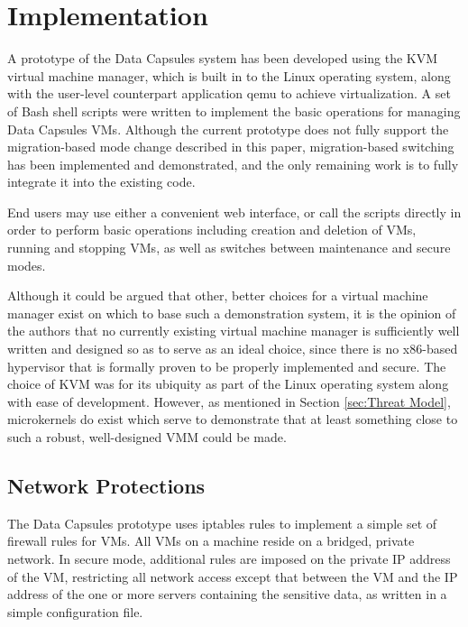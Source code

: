 \documentclass{acm_proc_article-sp}
\begin{document}
\section{Implementation}
\label{sec:Implementation}

A prototype of the Data Capsules system has been developed using the KVM virtual
machine manager, which is built in to the Linux operating system, along with the
user-level counterpart application qemu to achieve virtualization.  A set of
Bash shell scripts were written to implement the basic operations for managing
Data Capsules VMs.  Although the current prototype does not fully support the
migration-based mode change described in this paper, migration-based switching
has been implemented and demonstrated, and the only remaining work is to fully
integrate it into the existing code.

End users may use either a convenient web interface, or call the scripts
directly in order to perform basic operations including creation and deletion of
VMs, running and stopping VMs, as well as switches between maintenance and
secure modes.

Although it could be argued that other, better choices for a virtual machine
manager exist on which to base such a demonstration system, it is the opinion of
the authors that no currently existing virtual machine manager is sufficiently
well written and designed so as to serve as an ideal choice, since there is no
x86-based hypervisor that is formally proven to be properly implemented and
secure.  The choice of KVM was for its ubiquity as part of the Linux operating
system along with ease of development.  However, as mentioned in Section
\ref{sec:Threat Model}, microkernels do exist which serve to demonstrate that
at least something close to such a robust, well-designed VMM could be made.

\subsection{Network Protections}

The Data Capsules prototype uses iptables rules to implement a simple set of
firewall rules for VMs.  All VMs on a machine reside on a bridged, private
network.  In secure mode, additional rules are imposed on the private IP address
of the VM, restricting all network access except that between the VM and the IP
address of the one or more servers containing the sensitive data, as written in
a simple configuration file.  
\end{document}
